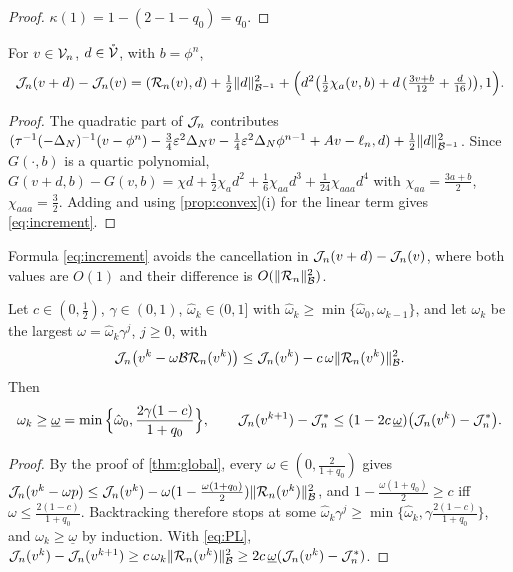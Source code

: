 \begin{proof}
$\kappa(1)=1-(2-1-q_0)=q_0$.
\end{proof}

\begin{lemma}\label{lem:increment}
For $v\in\mathcal{V}_n$, $d\in\mathring{\mathcal{V}}$, with $b=\phi^n$,
\begin{equation}\label{eq:increment}
\mathcal{J}_n(v+d)-\mathcal{J}_n(v)=(\mathcal{R}_n(v),d)+\tfrac12\lVert d\rVert_{\mathcal{B}^{-1}}^2+\Big(d^2\big(\tfrac12\chi_a(v,b)+d\,(\tfrac{3v+b}{12}+\tfrac d{16})\big),1\Big).
\end{equation}
\end{lemma}

\begin{proof}
The quadratic part of $\mathcal{J}_n$ contributes $(\tau^{-1}(-\Delta_N)^{-1}(v-\phi^n)-\frac34\varepsilon^2\Delta_N v-\frac14\varepsilon^2\Delta_N\phi^{n-1}+Av-\ell_n,d)+\frac12\lVert d\rVert_{\mathcal{B}^{-1}}^2$. Since $G(\cdot,b)$ is a quartic polynomial, $G(v+d,b)-G(v,b)=\chi d+\frac12\chi_ad^2+\frac16\chi_{aa}d^3+\frac1{24}\chi_{aaa}d^4$ with $\chi_{aa}=\frac{3a+b}2$, $\chi_{aaa}=\frac32$. Adding and using \cref{prop:convex}(i) for the linear term gives \eqref{eq:increment}.
\end{proof}
Formula \eqref{eq:increment} avoids the cancellation in $\mathcal{J}_n(v+d)-\mathcal{J}_n(v)$, where both values are $O(1)$ and their difference is $O(\lVert \mathcal{R}_n\rVert_{\mathcal{B}}^2)$.

\begin{theorem}\label{thm:armijo}
Let $c\in(0,\frac12)$, $\gamma\in(0,1)$, $\hat\omega_k\in(0,1]$ with $\hat\omega_k\ge\min\{\hat\omega_0,\omega_{k-1}\}$, and let $\omega_k$ be the largest $\omega=\hat\omega_k\gamma^j$, $j\ge0$, with
\[
\mathcal{J}_n\big(v^k-\omega\mathcal{B}\mathcal{R}_n(v^k)\big)\le\mathcal{J}_n(v^k)-c\,\omega\lVert \mathcal{R}_n(v^k)\rVert_{\mathcal{B}}^2 .
\] Then
\[
\omega_k\ge\underline\omega=\min\Big\{\hat\omega_0,\frac{2\gamma(1-c)}{1+q_0}\Big\},\qquad \mathcal{J}_n(v^{k+1})-\mathcal{J}_n^*\le(1-2c\,\underline\omega)\big(\mathcal{J}_n(v^k)-\mathcal{J}_n^*\big).
\]
\end{theorem}

\begin{proof}
By the proof of \cref{thm:global}, every $\omega\in(0,\frac2{1+q_0})$ gives $\mathcal{J}_n(v^k-\omega p)\le\mathcal{J}_n(v^k)-\omega(1-\frac{\omega(1+q_0)}2)\lVert \mathcal{R}_n(v^k)\rVert_{\mathcal{B}}^2$, and $1-\frac{\omega(1+q_0)}2\ge c$ iff $\omega\le\frac{2(1-c)}{1+q_0}$. Backtracking therefore stops at some $\hat\omega_k\gamma^j\ge\min\{\hat\omega_k,\gamma\frac{2(1-c)}{1+q_0}\}$, and $\omega_k\ge\underline\omega$ by induction. With \eqref{eq:PL}, $\mathcal{J}_n(v^k)-\mathcal{J}_n(v^{k+1})\ge c\,\omega_k\lVert \mathcal{R}_n(v^k)\rVert_{\mathcal{B}}^2\ge2c\,\underline\omega(\mathcal{J}_n(v^k)-\mathcal{J}_n^*)$.
\end{proof}

